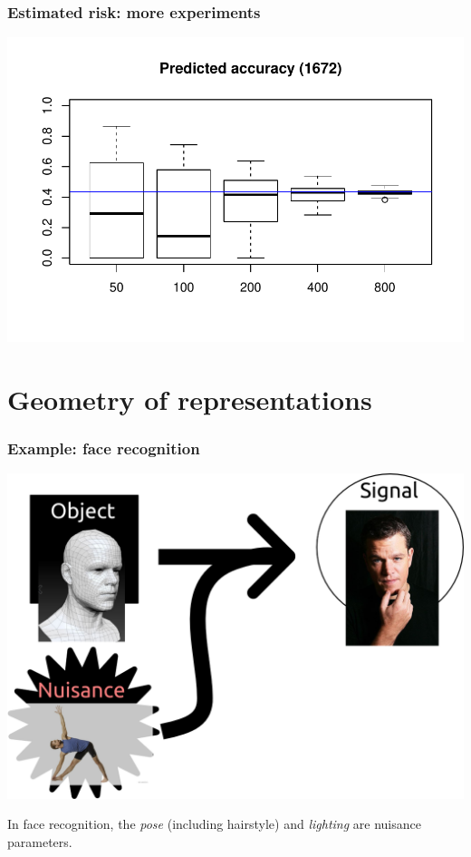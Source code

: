 \documentclass{beamer}
\begin{document}
\begin{frame}
\frametitle{Estimated risk: more experiments}
\begin{center}
\includegraphics[scale = 0.6]{../facerec/sub_preds.pdf}
\end{center}
\end{frame}


\section{Geometry of representations}

\begin{frame}
\sectionpage
\end{frame}



\begin{frame}
\frametitle{Example: face recognition}
\begin{center}
\includegraphics[scale = 0.2]{defense_diagrams/face_2a.png}
\end{center}
In face recognition, the \emph{pose} (including hairstyle) and \emph{lighting} are nuisance parameters.
\end{frame}
\end{document}
